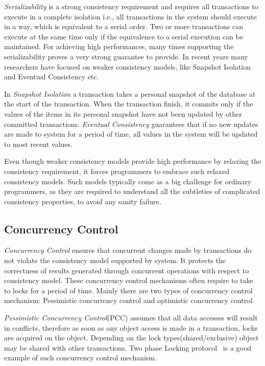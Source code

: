 \documentclass[12pt,english]{report}
\begin{document}
\textit{Serializability} is a strong consistency requirement and requires all transactions to execute in a complete isolation i.e., all transactions in the system should execute in a way, which is equivalent to a serial order. Two or more transactions can execute at the same time only if the equivalence to a serial execution can be maintained. For achieving high performances, many times supporting the serializability proves a very strong guarantee to provide. In recent years many researchers have focused on weaker consistency models, like Snapshot Isolation and Eventual Consistency etc.

In \textit{Snapshot Isolation} a transaction takes a personal snapshot of the database at the start of the transaction. When the transaction finish, it commits only if the values of the items in its personal snapshot have not been updated by other committed transactions. \textit{Eventual Consistency} guarantees that if no new updates are made to system for a period of time, all values in the system will be updated to most recent values.

Even though weaker consistency models provide high performance by relaxing the consistency requirement, it forces programmers to embrace such relaxed consistency models. Such models typically come as a big challenge for ordinary programmers, as they are required to understand all the subtleties of complicated consistency properties, to avoid any sanity failure.

\subsection{Concurrency Control} 

\textit{Concurrency Control} ensures that concurrent changes made by transactions do not violate the consistency model supported by system. It protects the correctness of results generated through concurrent operations with respect to consistency model. These concurrency control mechanisms often require to take to locks for a period of time. Mainly there are two types of concurrency control mechanism: Pessimistic concurrency control and optimistic concurrency control.

\textit{Pessimistic Concurrency Control}(PCC) assumes that all data accesses will result in conflicts, therefore as soon as any object access is made in a transaction, locks are acquired on the object. Depending on the lock types(shared/exclusive) object may be shared with other transactions. Two phase Locking protocol~\cite{2PL:lin1983basic} is a good example of such concurrency control mechanism.  
\end{document}
